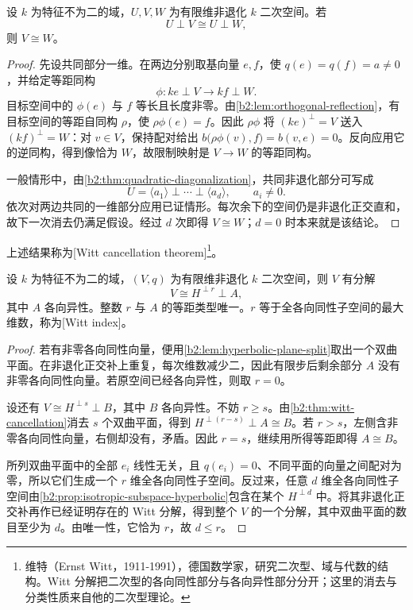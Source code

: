 \begin{theorem}[Witt 消去]\label{b2:thm:witt-cancellation}
	设 \(k\) 为特征不为二的域，\(U,V,W\) 为有限维非退化 \(k\) 二次空间。若
	\[
		U\perp V\cong U\perp W,
	\]
	则 \(V\cong W\)。
\end{theorem}
\begin{proof}
	先设共同部分一维。在两边分别取基向量 \(e,f\)，使 \(q(e)=q(f)=a\ne0\)，并给定等距同构
	\[
		\phi:ke\perp V\longrightarrow kf\perp W.
	\]
	目标空间中的 \(\phi(e)\) 与 \(f\) 等长且长度非零。由\cref{b2:lem:orthogonal-reflection}，有目标空间的等距自同构 \(\rho\)，使 \(\rho\phi(e)=f\)。因此 \(\rho\phi\) 将 \((ke)^\perp=V\) 送入 \((kf)^\perp=W\)：对 \(v\in V\)，保持配对给出 \(b\bigl(\rho\phi(v),f\bigr)=b(v,e)=0\)。反向应用它的逆同构，得到像恰为 \(W\)，故限制映射是 \(V\to W\) 的等距同构。

	一般情形中，由\cref{b2:thm:quadratic-diagonalization}，共同非退化部分可写成
	\[
		U=\langle a_1\rangle\perp\cdots\perp\langle a_d\rangle, \qquad a_i\ne0.
	\]
	依次对两边共同的一维部分应用已证情形。每次余下的空间仍是非退化正交直和，故下一次消去仍满足假设。经过 \(d\) 次即得 \(V\cong W\)；\(d=0\) 时本来就是该结论。
\end{proof}

上述结果称为[Witt cancellation theorem]\footnote{维特（Ernst Witt，1911-1991），德国数学家，研究二次型、域与代数的结构。Witt 分解把二次型的各向同性部分与各向异性部分分开；这里的消去与分类性质来自他的二次型理论。}。

\begin{theorem}[Witt 分解]\label{b2:thm:witt-decomposition}
	设 \(k\) 为特征不为二的域，\((V,q)\) 为有限维非退化 \(k\) 二次空间，则 \(V\) 有分解
	\[
		V\cong H^{\perp r}\perp A,
	\]
	其中 \(A\) 各向异性。整数 \(r\) 与 \(A\) 的等距类型唯一。\(r\) 等于全各向同性子空间的最大维数，称为[Witt index]。
\end{theorem}
\begin{proof}
	若有非零各向同性向量，便用\cref{b2:lem:hyperbolic-plane-split}取出一个双曲平面。在非退化正交补上重复，每次维数减少二，因此有限步后剩余部分 \(A\) 没有非零各向同性向量。若原空间已经各向异性，则取 \(r=0\)。

	设还有 \(V\cong H^{\perp s}\perp B\)，其中 \(B\) 各向异性。不妨 \(r\ge s\)。由\cref{b2:thm:witt-cancellation}消去 \(s\) 个双曲平面，得到 \(H^{\perp(r-s)}\perp A\cong B\)。若 \(r>s\)，左侧含非零各向同性向量，右侧却没有，矛盾。因此 \(r=s\)，继续用所得等距即得 \(A\cong B\)。

	所列双曲平面中的全部 \(e_i\) 线性无关，且 \(q(e_i)=0\)、不同平面的向量之间配对为零，所以它们生成一个 \(r\) 维全各向同性子空间。反过来，任意 \(d\) 维全各向同性子空间由\cref{b2:prop:isotropic-subspace-hyperbolic}包含在某个 \(H^{\perp d}\) 中。将其非退化正交补再作已经证明存在的 Witt 分解，得到整个 \(V\) 的一个分解，其中双曲平面的数目至少为 \(d\)。由唯一性，它恰为 \(r\)，故 \(d\le r\)。
\end{proof}

